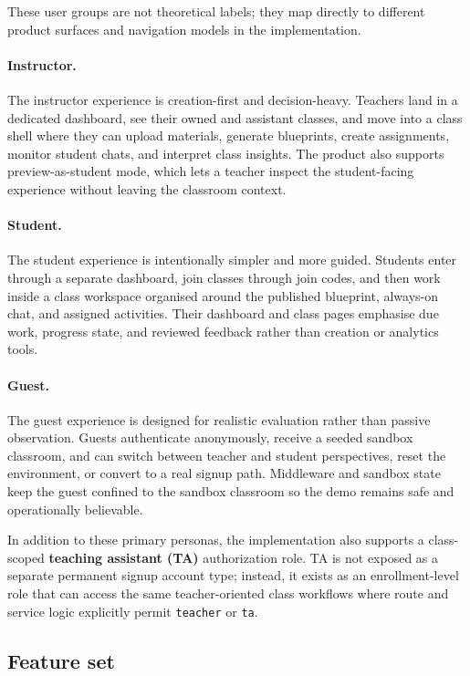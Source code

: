 \documentclass[11pt,a4paper]{article}
\begin{document}
These user groups are not theoretical labels; they map directly to different product surfaces and
navigation models in the implementation.

\paragraph*{Instructor.}
The instructor experience is creation-first and decision-heavy. Teachers land in a dedicated
dashboard, see their owned and assistant classes, and move into a class shell where they can upload
materials, generate blueprints, create assignments, monitor student chats, and interpret class
insights. The product also supports preview-as-student mode, which lets a teacher inspect the
student-facing experience without leaving the classroom context.

\paragraph*{Student.}
The student experience is intentionally simpler and more guided. Students enter through a separate
dashboard, join classes through join codes, and then work inside a class workspace organised around
the published blueprint, always-on chat, and assigned activities. Their dashboard and class pages
emphasise due work, progress state, and reviewed feedback rather than creation or analytics tools.

\paragraph*{Guest.}
The guest experience is designed for realistic evaluation rather than passive observation. Guests
authenticate anonymously, receive a seeded sandbox classroom, and can switch between teacher and
student perspectives, reset the environment, or convert to a real signup path. Middleware and
sandbox state keep the guest confined to the sandbox classroom so the demo remains safe and
operationally believable.

In addition to these primary personas, the implementation also supports a class-scoped
\textbf{teaching assistant (TA)} authorization role. TA is not exposed as a separate permanent
signup account type; instead, it exists as an enrollment-level role that can access the same
teacher-oriented class workflows where route and service logic explicitly permit \texttt{teacher}
or \texttt{ta}.

\subsection{Feature set}
\end{document}

